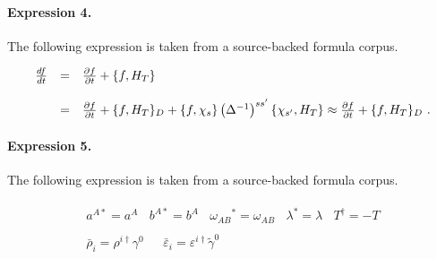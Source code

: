 \documentclass[11pt]{article}
\begin{document}
\paragraph{Expression 4.} The following expression is taken from a source-backed formula corpus.

\begin{align*}\begin{array}{r c l}\frac{df}{dt}&=&\frac{\partial f}{\partial t}+\{f,H_T\}\\ & & \\&=&\frac{\partial f}{\partial t}+\{f,H_T\}_D+\{f,\chi_s\}\left(\Delta^{-1}\right)^{ss'}\{\chi_{s'},H_T\}\approx\frac{\partial f}{\partial t}+\{f,H_T\}_D\ .\end{array}\end{align*}

\paragraph{Expression 5.} The following expression is taken from a source-backed formula corpus.

\begin{align*}\begin{array}{c}a^{A*}=a^{A}~~~~b^{A*}=b^{A}~~~~\omega_{AB}{}^{*}=\omega_{AB}~~~~\lambda^{*}=\lambda~~~~T^{\dagger}=-T\\{}\\\bar{\rho}_{i}=\rho^{i\dagger}\gamma^{0}~~~~~~~\bar{\varepsilon}_{i}=\varepsilon^{i\dagger}\tilde{\gamma}^{0}\end{array}\end{align*}
\end{document}
